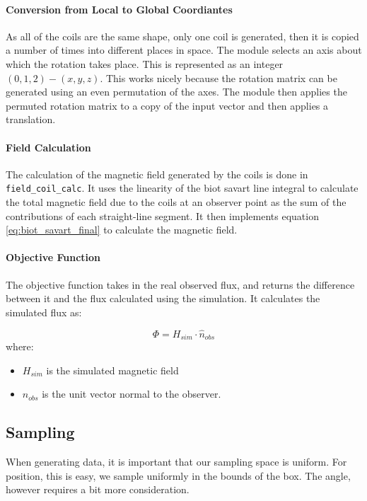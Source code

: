 \documentclass[12pt,a4paper]{report}
\begin{document}
\paragraph{Conversion from Local to Global Coordiantes}
As all of the coils are the same shape, only one coil is generated, then it is copied a number of times into different places in space. 
The module selects an axis about which the rotation takes place. This is represented as an integer $(0,1,2) - (x,y,z)$. This works nicely because the rotation matrix can be generated using an even permutation of the axes. The module then applies the permuted rotation matrix to a copy of the input vector and then applies a translation.

\paragraph{Field Calculation}
The calculation of the magnetic field generated by the coils is done in \lstinline[style=python]|field_coil_calc|. It uses the linearity of the biot savart line integral to calculate the total magnetic field due to the coils at an observer point as the sum of the contributions of each straight-line segment. It then implements equation \ref{eq:biot_savart_final} to calculate the magnetic field.

\paragraph{Objective Function}

The objective function takes in the real observed flux, and returns the difference between it and the flux calculated using the simulation. It calculates the simulated flux as:

\begin{equation}
  \Phi = H_{sim} \cdot \hat{n}_{obs}
\end{equation}
where:
\begin{itemize}
  \item $H_{sim}$ is the simulated magnetic field 
  \item $\hat{n}_{obs}$ is the unit vector normal to the observer.
\end{itemize}


\subsection{Sampling}
When generating data, it is important that our sampling space is uniform. For position, this is easy, we sample uniformly in the bounds of the box. The angle, however requires a bit more consideration.
\end{document}
